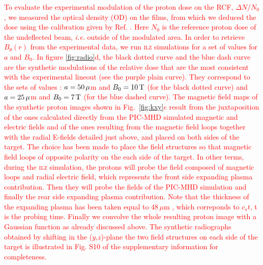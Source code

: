 \documentclass[aps,twocolumn,showpacs,superscriptaddress]{revtex4}
\begin{document}
\textcolor{red}{
To evaluate the experimental modulation of the proton dose on the RCF, $\Delta N/N_0$, we measured the optical density (OD) on the films, from which we deduced the dose using the calibration given by Ref. \cite{RSI_Chen_2016}. Here $N_0$ is the reference proton dose of the undeflected beam, \emph{i.e.} outside of the modulated area. In order to retrieve  $B_\theta(r)$ from the experimental data, we run \textsc{ilz} simulations for a set of values for $a$ and $B_0$. In figure \ref{fig:radio}d, the black dotted curve and the blue dash curve are the synthetic modulations of the relative dose that are the most consistent with the experimental lineout (see the purple plain curve). They correspond to the  sets of values : $a=50\,\rm \mu$m and $B_0=10\,\rm T$ (for the black dotted curve) and $a=25\,\rm \mu$m and $B_0=7\,\rm T$ (for the blue dashed curve).
%
The magnetic field maps of the synthetic proton images shown in Fig.~\ref{fig:kxy}c result from the juxtaposition of the ones calculated directly from the PIC-MHD simulated magnetic \textcolor{red}{and electric} fields and of the ones resulting from the magnetic field loops together with the radial E-fields detailed just above, and placed on both sides of the target.
The choice has been made to place the field structures so that  magnetic field loops of opposite polarity on the each side of the target.
%
In other terms, during the \textsc{ilz} simulation, the protons will probe the field composed of magnetic loops and \textcolor{red}{radial electric field}, which represents the front side expanding plasma contribution. Then they will probe  the fields of the PIC-MHD simulation and finally the rear side expanding plasma contribution.  Note that the thickness of the expanding plasma has been taken equal to $ 48 \, \mu$m , which correponds to $c_s t $, t is the probing time. Finally we convolve the whole resulting proton image with a Gaussian function as already discussed above. 
The synthetic radiographs obtained by shifting in the ($y$,$z$)-plane the two field structures on each side of the target is illustrated in Fig. S10 of the supplementary information for completeness. 
}
\end{document}
